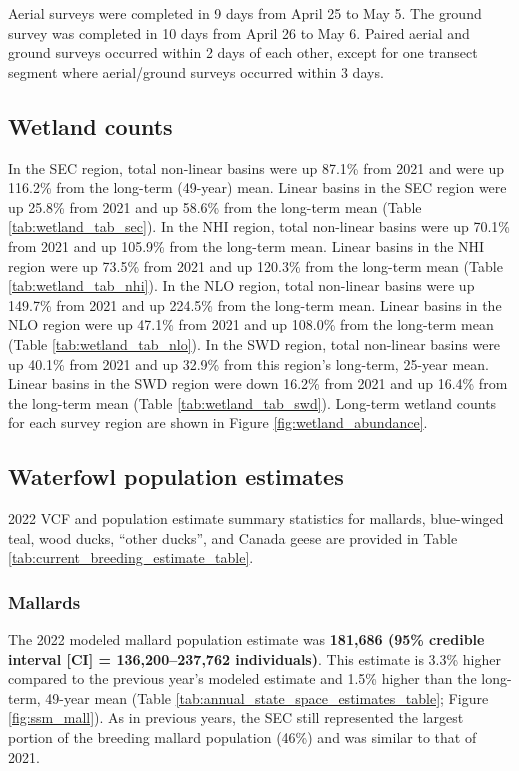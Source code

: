 \documentclass[
  12pt,
]{article}
\begin{document}
Aerial surveys were completed in 9 days from April 25 to May 5. The
ground survey was completed in 10 days from April 26 to May 6. Paired
aerial and ground surveys occurred within 2 days of each other, except
for one transect segment where aerial/ground surveys occurred within 3
days.

\hypertarget{wetland-counts}{%
\subsection{Wetland counts}\label{wetland-counts}}

In the SEC region, total non-linear basins were up 87.1\% from 2021 and
were up 116.2\% from the long-term (49-year) mean. Linear basins in the
SEC region were up 25.8\% from 2021 and up 58.6\% from the long-term
mean (Table \ref{tab:wetland_tab_sec}). In the NHI region, total
non-linear basins were up 70.1\% from 2021 and up 105.9\% from the
long-term mean. Linear basins in the NHI region were up 73.5\% from 2021
and up 120.3\% from the long-term mean (Table
\ref{tab:wetland_tab_nhi}). In the NLO region, total non-linear basins
were up 149.7\% from 2021 and up 224.5\% from the long-term mean. Linear
basins in the NLO region were up 47.1\% from 2021 and up 108.0\% from
the long-term mean (Table \ref{tab:wetland_tab_nlo}). In the SWD region,
total non-linear basins were up 40.1\% from 2021 and up 32.9\% from this
region's long-term, 25-year mean. Linear basins in the SWD region were
down 16.2\% from 2021 and up 16.4\% from the long-term mean (Table
\ref{tab:wetland_tab_swd}). Long-term wetland counts for each survey
region are shown in Figure \ref{fig:wetland_abundance}.

\hypertarget{waterfowl-population-estimates}{%
\subsection{Waterfowl population
estimates}\label{waterfowl-population-estimates}}

2022 VCF and population estimate summary statistics for mallards,
blue-winged teal, wood ducks, ``other ducks'', and Canada geese are
provided in Table \ref{tab:current_breeding_estimate_table}.

\hypertarget{mallards}{%
\subsubsection{Mallards}\label{mallards}}

The 2022 modeled mallard population estimate was \textbf{181,686 (95\%
credible interval {[}CI{]} = 136,200--237,762 individuals)}. This
estimate is 3.3\% higher compared to the previous year's modeled
estimate and 1.5\% higher than the long-term, 49-year mean (Table
\ref{tab:annual_state_space_estimates_table}; Figure
\ref{fig:ssm_mall}). As in previous years, the SEC still represented the
largest portion of the breeding mallard population (46\%) and was
similar to that of 2021.
\end{document}
